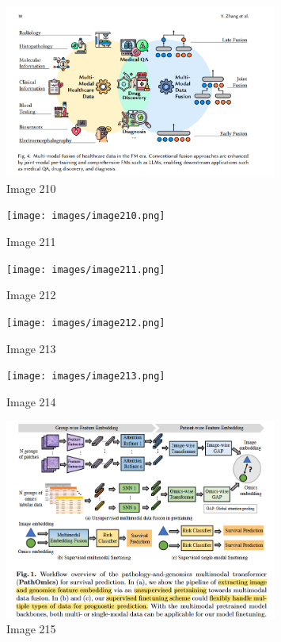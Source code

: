 \documentclass{article}%
\begin{document}
%


\begin{figure}[h!]%
\centering%
\includegraphics[width=0.8\textwidth]{images/image209.png}%
\caption{Image 210}%
\end{figure}

%


\begin{figure}[h!]%
\centering%
\texttt{[image: images/image210.png]}%
\caption{Image 211}%
\end{figure}

%


\begin{figure}[h!]%
\centering%
\texttt{[image: images/image211.png]}%
\caption{Image 212}%
\end{figure}

%


\begin{figure}[h!]%
\centering%
\texttt{[image: images/image212.png]}%
\caption{Image 213}%
\end{figure}

%


\begin{figure}[h!]%
\centering%
\texttt{[image: images/image213.png]}%
\caption{Image 214}%
\end{figure}

%


\begin{figure}[h!]%
\centering%
\includegraphics[width=0.8\textwidth]{images/image214.png}%
\caption{Image 215}%
\end{figure}
\end{document}

